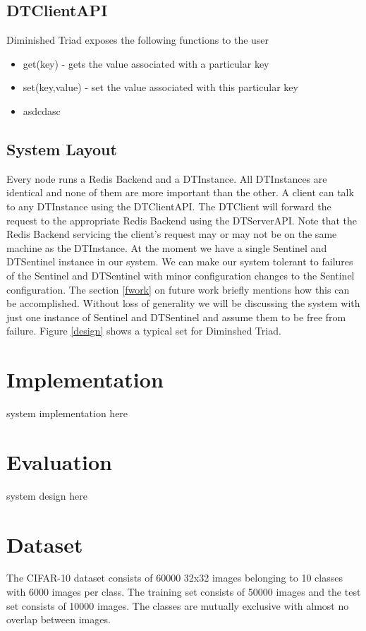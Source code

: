 \documentclass[10pt,twocolumn,letterpaper]{article}
\begin{document}
\subsection{DTClientAPI}
Diminished Triad exposes the following functions to the user 
\begin{itemize}
  \item get(key) - gets the value associated with a particular key
  \item set(key,value) - set the value associated with this particular key
  \item asdcdasc
\end{itemize}

\subsection{System Layout}
Every node runs a Redis Backend and a DTInstance. All DTInstances are identical and none of them are more important than the other. A client can talk to any DTInstance using the DTClientAPI. The DTClient will forward the request to the appropriate Redis Backend using the DTServerAPI. Note that the Redis Backend servicing the client's request may or may not be on the same machine as the DTInstance.
At the moment we have a single Sentinel and DTSentinel instance in our system. We can make our system tolerant to failures of the Sentinel and DTSentinel with minor configuration changes to the Sentinel configuration. The section \ref{fwork} on future work briefly mentions how this can be accomplished. Without loss of generality we will be discussing the system with just one instance of Sentinel and DTSentinel and assume them to be free from failure. Figure \ref{design} shows a typical set for Diminshed Triad.

\section{Implementation} \label{implementation}
system implementation here

\section{Evaluation} \label{evaluation}
system design here

\section{Dataset}
The CIFAR-10 dataset \cite{krizhevsky2009learning} consists of 60000 32x32 images belonging to 10 classes with 6000 images per class.	The training set consists of 50000 images and the test set consists of 10000 images. The classes are mutually exclusive with almost no overlap between images.
\end{document}

